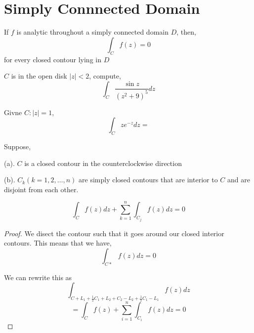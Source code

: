 \section*{Simply Connnected Domain}

\begin{theorem}
   If $f$ is analytic throughout a simply connected domain $D$, then, 
   $$ \int_C f(z) = 0 $$ for every closed contour lying in $D$
\end{theorem}

\begin{ex}
   $C$ is in the open disk $|z| < 2$, compute, 
   $$ \int_C \frac{\sin z}{(z^2 + 9)^{5}}dz $$ 
\end{ex}

\begin{solution}
   
\end{solution}

\begin{ex}
   Givne $C: |z| = 1$,  
   $$ \int_C z e^{-z}dz =  $$ 
\end{ex}

\begin{theorem} Suppose, 

   (a). $C$ is a closed contour in the counterclockwise direction

   (b). $C_k(k = 1,2,\dots, n)$ are simply closed contours that are interior to  $C$ and are disjoint from each other.
   
   $$ \int_C f(z) dz + \sum_{k = 1}^n \int_{C_j} f(z) dz = 0 $$ 
\end{theorem}
\begin{proof}
   We disect the contour such that it goes around our closed interior contours. This means that we have,
   $$ \int_{C*} f(z) dz = 0 $$ 

   We can rewrite this as  
   $$ \int_{C + L_1 + \frac{1}{2}C_1 + L_2 + C_2 - L_2 + \frac{1}{2}C_1 - L_1} f(z) dz $$ 
   $$ = \int_{C} f(z) + \sum_{i = 1}^n \int_{C_i} f(z) dz = 0 $$ 
\end{proof}
